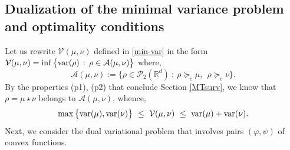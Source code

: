 \documentclass[11pt,letterpaper,reqno]{amsart}
\theoremstyle{definition}
\numberwithin{equation}{section}
\def\f{\varphi}
\newcommand{\R}{\mathbb{R}}
\newcommand{\A}{\mathcal{A}}
\newcommand{\var}{{\rm{var}}}
\newcommand{\PP}{\mathcal{P}}
\newcommand{\V}{{\mathcal{V}}}
\begin{document}
\subsection{Dualization of the minimal variance problem and optimality conditions}  Let us rewrite $\V(\mu,\nu)$  defined in  \eqref{min-var} in the form $\V(\mu,\nu) = \inf \big\{ \var(\rho) \, :\,  \rho \in\A(\mu,\nu)\big\}$ where,
 \begin{equation}\label{def:Amunu}
\A(\mu,\nu):= \Big\{ \rho\in \PP_2(\R^d) \ : \ \rho \succeq_c \mu, \ \ \rho \succeq_c \nu \Big\}.
\end{equation}
  By the properties (p1), (p2) that conclude Section \ref{MTsurv}, we know that
   $\rho=\mu\star\nu$ belongs to $\A(\mu,\nu)$, whence,
\begin{equation}\label{Vbounds}
 \max \big\{ \var(\mu) , \var(\nu) \big\} \ \le\  \V(\mu,\nu) \ \le\ \var(\mu) + \var(\nu) .
\end{equation}
Next, we consider the dual variational problem that involves pairs  $(\f,\psi)$ of convex functions.
\end{document}
